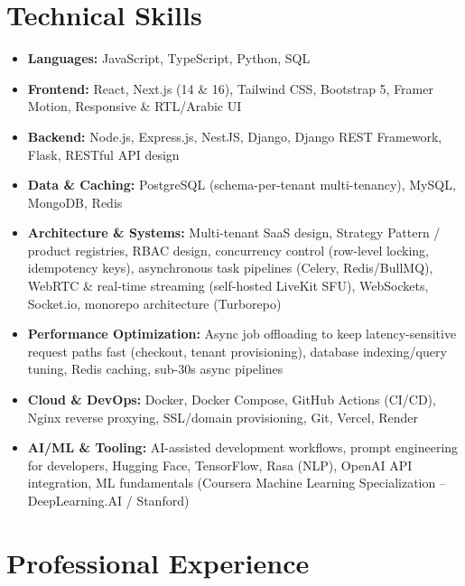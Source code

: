 \documentclass[10.5pt,letterpaper]{article}
\newcommand{\sectionrule}{\vspace{-1pt}{\color{hairline}\hrule height 0.6pt}\vspace{6pt}}
\begin{document}
\section*{Technical Skills}
\sectionrule
\begin{itemize}
    \item \textbf{Languages:} JavaScript, TypeScript, Python, SQL
    \item \textbf{Frontend:} React, Next.js (14 \& 16), Tailwind CSS, Bootstrap 5, Framer Motion, Responsive \& RTL/Arabic UI
    \item \textbf{Backend:} Node.js, Express.js, NestJS, Django, Django REST Framework, Flask, RESTful API design
    \item \textbf{Data \& Caching:} PostgreSQL (schema-per-tenant multi-tenancy), MySQL, MongoDB, Redis
    \item \textbf{Architecture \& Systems:} Multi-tenant SaaS design, Strategy Pattern / product registries, RBAC design,
    concurrency control (row-level locking, idempotency keys), asynchronous task pipelines (Celery, Redis/BullMQ),
    WebRTC \& real-time streaming (self-hosted LiveKit SFU), WebSockets, Socket.io, monorepo architecture (Turborepo)
    \item \textbf{Performance Optimization:} Async job offloading to keep latency-sensitive request paths fast
    (checkout, tenant provisioning), database indexing/query tuning, Redis caching, sub-30s async pipelines
    \item \textbf{Cloud \& DevOps:} Docker, Docker Compose, GitHub Actions (CI/CD), Nginx reverse proxying,
    SSL/domain provisioning, Git, Vercel, Render
    \item \textbf{AI/ML \& Tooling:} AI-assisted development workflows, prompt engineering for developers, Hugging Face,
    TensorFlow, Rasa (NLP), OpenAI API integration, ML fundamentals (Coursera Machine Learning Specialization --
    DeepLearning.AI / Stanford)
\end{itemize}

\section*{Professional Experience}
\sectionrule
\end{document}
